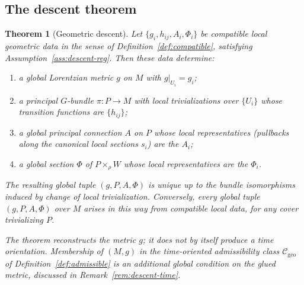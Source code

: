 \documentclass[11pt,a4paper]{article}
\theoremstyle{plain}
\newtheorem{theorem}{Theorem}[section]
\theoremstyle{definition}
\theoremstyle{remark}
\newcommand{\Cgeo}{\mathcal{C}_{\mathrm{geo}}}
\begin{document}
\subsection{The descent theorem}

\begin{theorem}[Geometric descent]
\label{thm:descent}
Let $\{g_i,h_{ij},A_i,\Phi_i\}$ be compatible local geometric data in the sense of
Definition~\ref{def:compatible}, satisfying Assumption~\ref{ass:descent-reg}. Then these data
determine:
\begin{enumerate}[label=(\arabic*),leftmargin=2.2em]
\item a global Lorentzian metric $g$ on $M$ with $g|_{U_i}=g_i$;
\item a principal $G$-bundle $\pi\colon P\to M$ with local trivializations over $\{U_i\}$ whose
      transition functions are $\{h_{ij}\}$;
\item a global principal connection $A$ on $P$ whose local representatives (pullbacks along the
      canonical local sections $s_i$) are the $A_i$;
\item a global section $\Phi$ of $P\times_\rho W$ whose local representatives are the $\Phi_i$.
\end{enumerate}
The resulting global tuple $(g,P,A,\Phi)$ is unique up to the bundle isomorphisms induced by
change of local trivialization. Conversely, every global tuple $(g,P,A,\Phi)$ over $M$ arises in
this way from compatible local data, for any cover trivializing $P$.

The theorem reconstructs the metric $g$; it does \emph{not} by itself produce a time orientation.
Membership of $(M,g)$ in the time-oriented admissibility class $\Cgeo$ of
Definition~\ref{def:admissible} is an additional \emph{global} condition on the glued metric,
discussed in Remark~\ref{rem:descent-time}.
\end{theorem}
\end{document}
